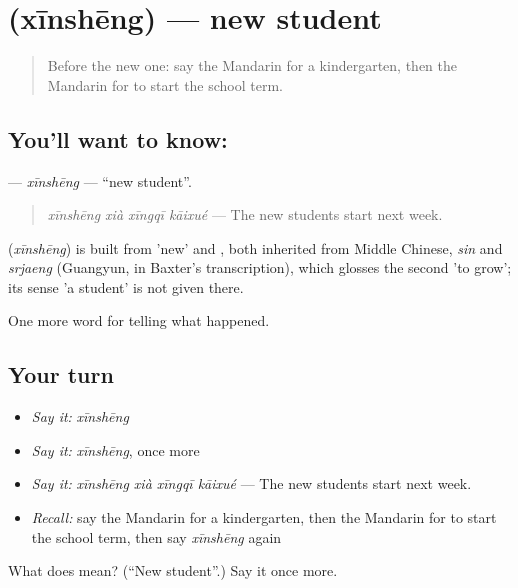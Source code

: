 \section[\texorpdfstring{\zh{新生} (xīnshēng)}{新生 (xīnshēng)}]{ (xīnshēng) — new student}

\label{lesson:ZH-C303-xinsheng}



\begin{quote}
Before the new one: say the Mandarin for a kindergarten, then the Mandarin for to start the school term.
\end{quote}

\subsection*{You'll want to know: }
\textbf{} — \emph{xīnshēng} — \textquotedblleft{}new student\textquotedblright{}.

\begin{quote}
\textbf{} \emph{xīnshēng xià xīngqī kāixué} — The new students start next week.
\end{quote}

\begin{cousinweb}
\textbf{} (\emph{xīnshēng}) is built from  'new' and , both inherited from Middle Chinese, \emph{sin} and \emph{srjaeng} (Guangyun, in Baxter's transcription), which glosses the second 'to grow'; its sense 'a student' is not given there.
\end{cousinweb}

\begin{grammarlens}[title={What you've built}]
One more word for telling what happened.
\end{grammarlens}

\subsection*{Your turn}
\begin{itemize}
\raggedright
  \item \emph{Say it:} \emph{xīnshēng}
  \item \emph{Say it:} \emph{xīnshēng}, once more
  \item \emph{Say it:} \emph{xīnshēng xià xīngqī kāixué} — The new students start next week.
  \item \emph{Recall:} say the Mandarin for a kindergarten, then the Mandarin for to start the school term, then say \emph{xīnshēng} again
\end{itemize}

\begin{tcolorbox}[breakable,colback=teal!4,colframe=teal!35!black,title={Before you move on}]
What does  mean? (\textquotedblleft{}New student\textquotedblright{}.) Say it once more.
\end{tcolorbox}
